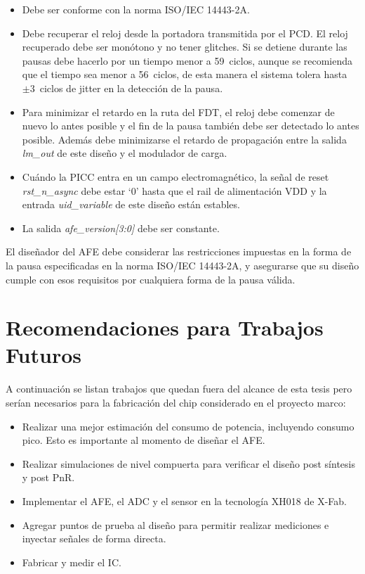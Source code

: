\documentclass[a4paper, twoside, 11pt]{report}
\begin{document}
\begin{itemize}
  \item Debe ser conforme con la norma ISO/IEC 14443-2A.
  \item Debe recuperar el reloj desde la portadora transmitida por el PCD. El reloj recuperado debe ser monótono y no tener glitches. Si se detiene durante las pausas debe hacerlo por un tiempo menor a 59~ciclos, aunque se recomienda que el tiempo sea menor a 56~ciclos, de esta manera el sistema tolera hasta $\pm 3$~ciclos de jitter en la detección de la pausa.
  \item Para minimizar el retardo en la ruta del FDT, el reloj debe comenzar de nuevo lo antes posible y el fin de la pausa también debe ser detectado lo antes posible. Además debe minimizarse el retardo de propagación entre la salida \textit{lm\_out} de este diseño y el modulador de carga.
  \item Cuándo la PICC entra en un campo electromagnético, la señal de reset \textit{rst\_n\_async} debe estar ‘0’ hasta que el rail de alimentación VDD y la entrada \textit{uid\_variable} de este diseño están estables.
  \item La salida \textit{afe\_version[3:0]} debe ser constante.
\end{itemize}

El diseñador del AFE debe considerar las restricciones impuestas en la forma de la pausa especificadas en la norma ISO/IEC 14443-2A, y asegurarse que su diseño cumple con esos requisitos por cualquiera forma de la pausa válida.

\FloatBarrier
\section{Recomendaciones para Trabajos Futuros}

A continuación se listan trabajos que quedan fuera del alcance de esta tesis pero serían necesarios para la fabricación del chip considerado en el proyecto marco:

\begin{itemize}
  \item Realizar una mejor estimación del consumo de potencia, incluyendo consumo pico. Esto es importante al momento de diseñar el AFE.
  \item Realizar simulaciones de nivel compuerta para verificar el diseño post síntesis y post PnR.
  \item Implementar el AFE, el ADC y el sensor en la tecnología XH018 de X-Fab.
  \item Agregar puntos de prueba al diseño para permitir realizar mediciones e inyectar señales de forma directa.
  \item Fabricar y medir el IC.
\end{itemize}
\end{document}
